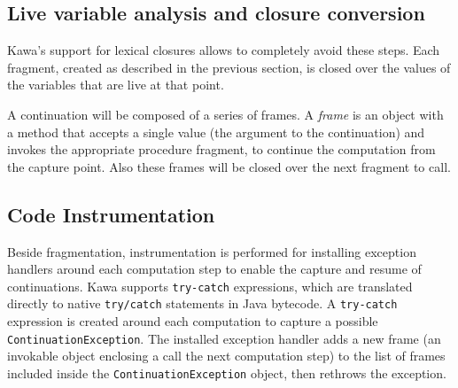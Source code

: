 \documentclass[12pt,a4paper,oneside,openright]{book}
\newenvironment{Shaded}{\begin{snugshade}}{\end{snugshade}}
\newcommand{\KeywordTok}[1]{\textcolor[rgb]{0.13,0.29,0.53}{\textbf{{#1}}}}
\newcommand{\DecValTok}[1]{\textcolor[rgb]{0.00,0.00,0.81}{{#1}}}
\newcommand{\CommentTok}[1]{\textcolor[rgb]{0.56,0.35,0.01}{\textit{{#1}}}}
\newcommand{\NormalTok}[1]{{#1}}
\begin{document}
\begin{Shaded}
\end{Shaded}

\subsection{Live variable analysis and closure
conversion}\label{live-variable-analysis-and-closure-conversion}

Kawa's support for lexical closures allows to completely avoid these
steps. Each fragment, created as described in the previous section, is
closed over the values of the variables that are live at that point.

A continuation will be composed of a series of frames. A \emph{frame} is
an object with a method that accepts a single value (the argument to the
continuation) and invokes the appropriate procedure fragment, to
continue the computation from the capture point. Also these frames will
be closed over the next fragment to call.

\subsection{Code Instrumentation}\label{code-instrumentation}

Beside fragmentation, instrumentation is performed for installing
exception handlers around each computation step to enable the capture
and resume of continuations. Kawa supports \texttt{try-catch}
expressions, which are translated directly to native \texttt{try/catch}
statements in Java bytecode. A \texttt{try-catch} expression is created
around each computation to capture a possible
\texttt{ContinuationException}. The installed exception handler adds a
new frame (an invokable object enclosing a call the next computation
step) to the list of frames included inside the
\texttt{ContinuationException} object, then rethrows the exception.
\end{document}
